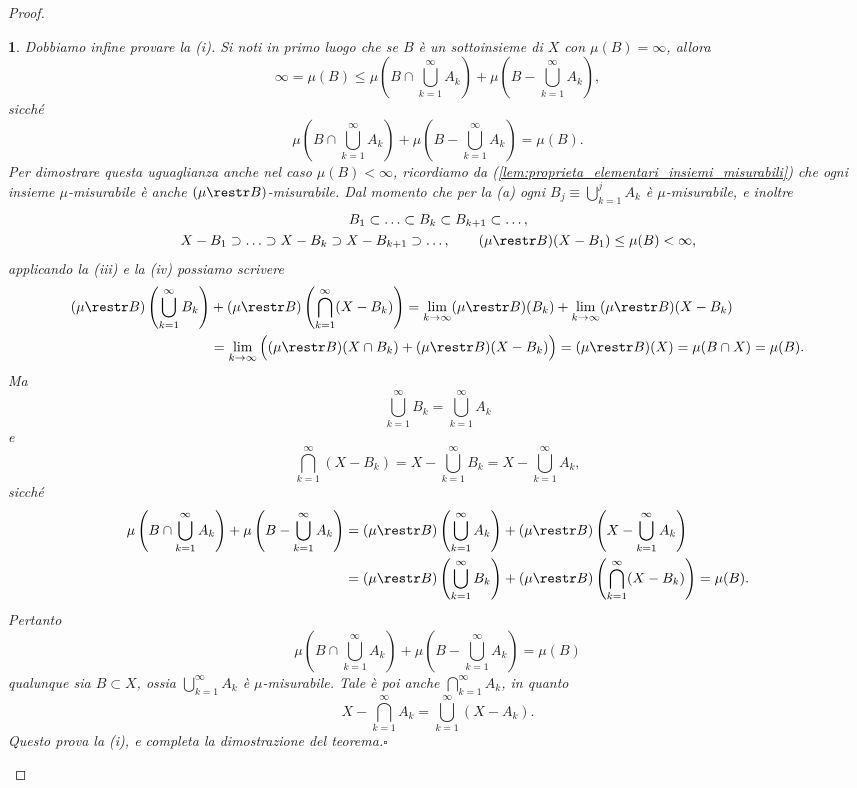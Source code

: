 \documentclass[a4paper,10pt,openright,oneside]{book}
\theoremstyle{theoremstyle}
\theoremstyle{theoremstylewoheader}
\theoremstyle{theoremstyle}
\theoremstyle{proofsecstyle}
\newtheorem{proofsec}{}
\theoremstyle{nonumberplain}
\newtheorem{proof}{Dim.}
\renewcommand{\qedsymbol}{\ensuremath{\square}}
\newcommand{\qed}{\unskip\nobreak\hfill\nobreak\hspace{.5em}\qedsymbol}
\begin{document}
\begin{proof}
\begin{proofsec}
Dobbiamo infine provare la (i). Si noti in primo luogo che se $B$ è un sottoinsieme di $X$ con $\mu(B) = \infty$, allora
\[
\infty = \mu(B) \le \mu\left(B \cap \bigcup_{k=1}^\infty A_k\right) + \mu\left(B - \bigcup_{k=1}^\infty A_k\right),
\]
sicché
\[
\mu\left(B \cap \bigcup_{k=1}^\infty A_k\right) + \mu\left(B - \bigcup_{k=1}^\infty A_k\right) = \mu(B).
\]
Per dimostrare questa uguaglianza anche nel caso $\mu(B) < \infty$, ricordiamo da (\ref{lem:proprieta_elementari_insiemi_misurabili}) che ogni insieme $\mu$-misurabile è anche $(\mu \restr B)$-misurabile. Dal momento che per la (a) ogni $B_j \equiv \bigcup_{k=1}^j A_k$ è $\mu$-misurabile, e inoltre
\begin{gather*}
B_1 \subset \ldots \subset B_k \subset B_{k+1} \subset \ldots,\\
X - B_1 \supset \ldots \supset X - B_k \supset X - B_{k+1} \supset \ldots,\qquad (\mu\restr B)(X - B_1) \le \mu(B) < \infty,
\end{gather*}
applicando la (iii) e la (iv) possiamo scrivere
\begin{align*}
(\mu \restr B) \left(\bigcup_{k=1}^\infty B_k\right) &+ (\mu \restr B) \left(\bigcap_{k=1}^\infty (X - B_k)\right) = \lim_{k \to \infty} (\mu \restr B) (B_k) + \lim_{k \to \infty} (\mu \restr B) (X - B_k)\\
&= \lim_{k \to \infty} \Big((\mu \restr B) (X \cap B_k) + (\mu \restr B) (X - B_k)\Big) = (\mu \restr B) (X) = \mu(B \cap X) = \mu(B).
\end{align*}
Ma
\[
\bigcup_{k=1}^\infty B_k = \bigcup_{k=1}^\infty A_k
\]
e
\[
\bigcap_{k=1}^\infty (X - B_k) = X - \bigcup_{k=1}^\infty B_k = X - \bigcup_{k=1}^\infty A_k,
\]
sicché
\begin{align*}
\mu\left(B \cap \bigcup_{k=1}^\infty A_k\right) + \mu\left(B - \bigcup_{k=1}^\infty A_k\right) &= (\mu \restr B) \left(\bigcup_{k=1}^\infty A_k\right) + (\mu \restr B) \left(X - \bigcup_{k=1}^\infty A_k\right)\\
&= (\mu \restr B) \left(\bigcup_{k=1}^\infty B_k\right) + (\mu \restr B) \left(\bigcap_{k=1}^\infty (X - B_k)\right) = \mu(B).
\end{align*}
Pertanto
\[
\mu\left(B \cap \bigcup_{k=1}^\infty A_k\right) + \mu\left(B - \bigcup_{k=1}^\infty A_k\right) = \mu(B)
\]
qualunque sia $B \subset X$, ossia $\bigcup_{k=1}^\infty A_k$ è $\mu$-misurabile. Tale è poi anche $\bigcap_{k=1}^\infty A_k$, in quanto
\[
X - \bigcap_{k=1}^\infty A_k = \bigcup_{k=1}^\infty (X - A_k).
\]
Questo prova la (i), e completa la dimostrazione del teorema.\qed
\end{proofsec}
\end{proof}
\end{document}
